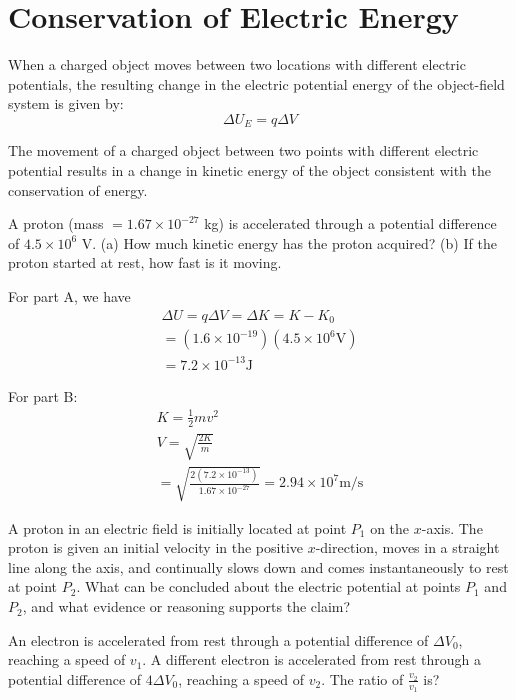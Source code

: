 \documentclass[../em.tex]{subfiles}
\begin{document}
\section{Conservation of Electric Energy}
When a charged object moves between two locations with different electric potentials, the resulting change in the electric potential energy
of the object-field system is given by:
\[\Delta U_E=q\Delta V\]

The movement of a charged object between two points with different electric potential results in a change in kinetic
energy of the object consistent with the conservation of energy.

\begin{example}
    A proton (mass $=1.67\times10^{-27}$ kg) is accelerated through a potential difference of $4.5\times10^6$ V.
    (a) How much kinetic energy has the proton acquired? (b) If the proton started at rest, how fast is it moving.

    For part A, we have
    \begin{align*}
    \Delta U = q\Delta V = \Delta K = K-K_0 \\
    = (1.6\times10^{-19})(4.5\times10^6\text{V})\\
    = 7.2\times10^{-13}\text{J}
    \end{align*}

    For part B:
    \begin{align*}
        K = \frac{1}{2}mv^2\\
        V = \sqrt{\frac{2K}{m}}\\
        = \sqrt{\frac{2(7.2\times10^{-13})}{1.67\times10^{-27}}}=2.94\times10^7\text{m/s}
    \end{align*}
    
\end{example}
\ex A proton in an electric field is initially located at point $P_1$ on the $x$-axis. The proton is given an initial velocity in the positive $x$-direction, moves in a straight line along the axis, and 
continually slows down and comes instantaneously to rest at point $P_2$. What can be concluded about the electric potential at points $P_1$ and $P_2$, and what evidence or reasoning supports the claim?

\ex An electron is accelerated from rest through a potential difference of $\Delta V_0$, reaching a speed of $v_1$. A different electron is accelerated from rest through a potential difference of $4\Delta V_0$, reaching a speed of $v_2$. The ratio of $\frac{v_2}{v_1}$ is?
\end{document}

